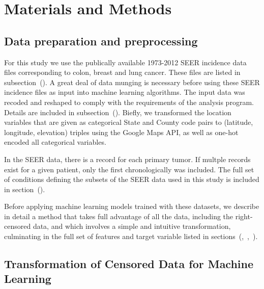 \documentclass[10pt,letterpaper]{article}
\begin{document}
\section{Materials and Methods}
\label{sec:materialsandmethods}

 


\subsection{Data preparation and preprocessing}
\label{subsec:dataprep} 

For this study we use the publically available 1973-2012 SEER incidence data files corresponding to colon, breast and lung cancer. These files are listed in subsection~().
A great deal of data munging is necessary before using these SEER incidence files as input into machine learning algorithms. 
The input data was recoded and reshaped to comply with the requirements of the analysis program. Details are included in subsection~(). Biefly, we transformed the location variables that are given as categorical State and County code pairs
to (latitude, longitude, elevation) triples using the Google Maps API, as well as one-hot encoded all categorical variables.


In the SEER data, there is a record for each primary tumor. If multple records exist for a given patient, only the first chronologically was included. The full set of conditions defining the subsets of the SEER data used in this study is included in section~().





Before applying machine learning models trained with these datasets, we describe in detail a method that takes full advantage of all the data, including the right-censored data, and which involves a simple and intuitive transformation, culminating in the full set of features and target variable listed in sections~(,~,~). 



\subsection{Transformation of Censored Data for Machine Learning}
\label{subsec:transformation}
\end{document}
